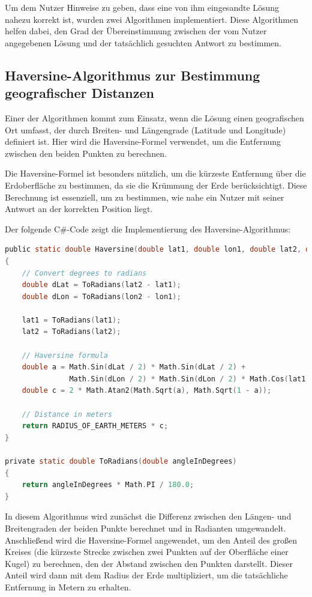 Um dem Nutzer Hinweise zu geben, dass eine von ihm eingesandte Lösung nahezu korrekt ist, wurden zwei Algorithmen implementiert. Diese Algorithmen helfen dabei, den Grad der Übereinstimmung zwischen der vom Nutzer angegebenen Lösung und der tatsächlich gesuchten Antwort zu bestimmen.

\subsection{Haversine-Algorithmus zur Bestimmung geografischer Distanzen}

Einer der Algorithmen kommt zum Einsatz, wenn die Lösung einen geografischen Ort umfasst, der durch Breiten- und Längengrade (Latitude und Longitude) definiert ist. Hier wird die Haversine-Formel verwendet, um die Entfernung zwischen den beiden Punkten zu berechnen.

Die Haversine-Formel ist besonders nützlich, um die kürzeste Entfernung über die Erdoberfläche zu bestimmen, da sie die Krümmung der Erde berücksichtigt. Diese Berechnung ist essenziell, um zu bestimmen, wie nahe ein Nutzer mit seiner Antwort an der korrekten Position liegt.

Der folgende C\#-Code zeigt die Implementierung des Haversine-Algorithmus:

\begin{lstlisting}[language=c, caption={Code Ausschnitt zum Haversine Algorithmus in C\#}]
public static double Haversine(double lat1, double lon1, double lat2, double lon2)
{
    // Convert degrees to radians
    double dLat = ToRadians(lat2 - lat1);
    double dLon = ToRadians(lon2 - lon1);

    lat1 = ToRadians(lat1);
    lat2 = ToRadians(lat2);

    // Haversine formula
    double a = Math.Sin(dLat / 2) * Math.Sin(dLat / 2) +
               Math.Sin(dLon / 2) * Math.Sin(dLon / 2) * Math.Cos(lat1) * Math.Cos(lat2);
    double c = 2 * Math.Atan2(Math.Sqrt(a), Math.Sqrt(1 - a));

    // Distance in meters
    return RADIUS_OF_EARTH_METERS * c;
}

private static double ToRadians(double angleInDegrees)
{
    return angleInDegrees * Math.PI / 180.0;
}
\end{lstlisting}

In diesem Algorithmus wird zunächst die Differenz zwischen den Längen- und Breitengraden der beiden Punkte berechnet und in Radianten umgewandelt. Anschließend wird die Haversine-Formel angewendet, um den Anteil des großen Kreises (die kürzeste Strecke zwischen zwei Punkten auf der Oberfläche einer Kugel) zu berechnen, den der Abstand zwischen den Punkten darstellt. Dieser Anteil wird dann mit dem Radius der Erde multipliziert, um die tatsächliche Entfernung in Metern zu erhalten.

